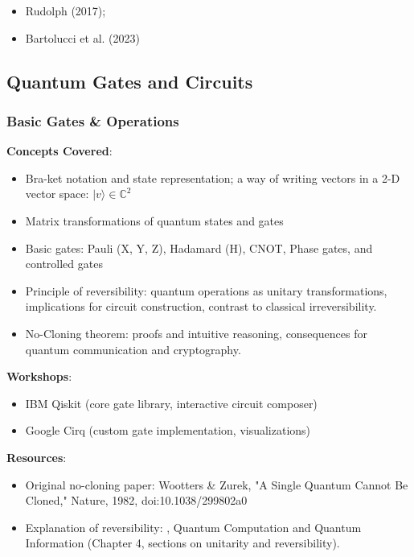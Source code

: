\begin{itemize}
	\item Rudolph (2017);

	\item Bartolucci et al. (2023)
\end{itemize}

	
\subsection{Quantum Gates and Circuits}

	
\subsubsection{Basic Gates \& Operations}

\textbf{Concepts Covered}:

\begin{itemize}
	\item Bra-ket notation and state representation; a way of writing vectors in a 2-D vector space: $|v \rangle \in \mathbb{C}^2$
	\item Matrix transformations of quantum states and gates
	\item Basic gates: Pauli (X, Y, Z), Hadamard (H), CNOT, Phase gates, and controlled gates
	\item Principle of reversibility: quantum operations as unitary transformations, implications for circuit construction, contrast to classical irreversibility.
	\item No-Cloning theorem: proofs and intuitive reasoning, consequences for quantum communication and cryptography.
\end{itemize}
	
\textbf{Workshops}:

\begin{itemize}	
	\item IBM Qiskit (core gate library, interactive circuit composer)
	\item Google Cirq (custom gate implementation, visualizations)
\end{itemize}

\textbf{Resources}:

\begin{itemize}
	\item Original no-cloning paper: Wootters \& Zurek, "A Single Quantum Cannot Be Cloned," Nature, 1982, doi:10.1038/299802a0
	\item Explanation of reversibility: \citeauthor{Nielsen:2000}, Quantum Computation and Quantum Information (Chapter 4, sections on unitarity and reversibility).
\end{itemize}


